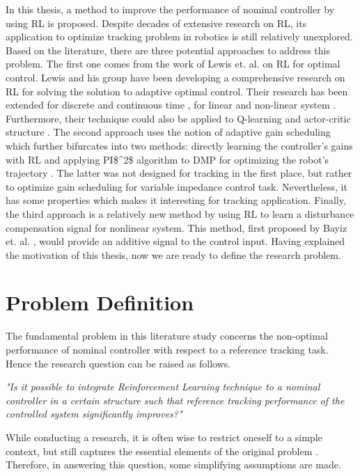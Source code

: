 In this thesis, a method to improve the performance of nominal controller by using \acs{RL} is proposed. Despite decades of extensive research on \acs{RL}, its application to optimize tracking problem in robotics is still relatively unexplored. Based on the literature, there are three potential approaches to address this problem. The first one comes from the work of Lewis et. al. on \acs{RL} for optimal control. Lewis and his group have been developing a comprehensive research on \acs{RL} for solving the solution to adaptive optimal control. Their research has been extended for discrete \cite{Kiumarsi20141167} and continuous time \cite{Modares6760477}, for linear \cite{Kiumarsi6760476} and non-linear system \cite{Kiumarsi6918527}. Furthermore, their technique could also be applied to Q-learning \cite{Kiumarsi20141167} and actor-critic structure \cite{Kiumarsi6918527}. The second approach uses the notion of adaptive gain scheduling which further bifurcates into two methods: directly learning the controller's gains with \acs {RL} \cite{Brujeni5669655} and applying \ac{PI$^2$} algorithm to \ac {DMP} for optimizing the robot's trajectory \cite{Buchli2010} \cite{Buchli6037312} . The latter was not designed for tracking in the first place, but rather to optimize gain scheduling for variable impedance control task. Nevertheless, it has some properties which makes it interesting for tracking application. Finally, the third approach is a relatively new method by using \acs{RL} to learn a disturbance compensation signal for nonlinear system. This method, first proposed by Bayiz et. al. \cite{Efe2014}, would provide an additive signal to the control input. Having explained the motivation of this thesis, now we are ready to define the research problem.



\section{Problem Definition}
The fundamental problem in this literature study concerns the non-optimal performance of nominal controller with respect to a reference tracking task. Hence the research question can be raised as follows.

\textit{"Is it possible to integrate Reinforcement Learning technique to a nominal controller in a certain structure such that reference tracking performance of the controlled system significantly improves?"}

While conducting a research, it is often wise to restrict oneself to a simple context, but still captures the essential elements of the original problem \cite{einstein}. Therefore, in answering this question, some simplifying assumptions are made.

